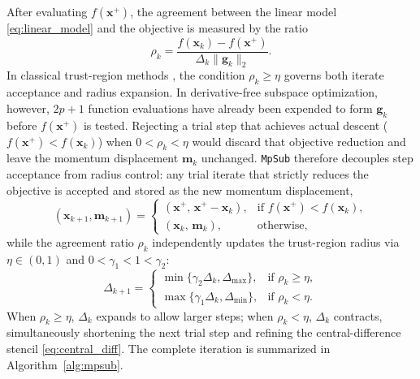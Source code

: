 \documentclass[smallextended]{svjour3}
\newcommand{\bx}{\bm{x}}
\newcommand{\bg}{\bm{g}}
\begin{document}
After evaluating $f(\bx^+)$, the agreement between the linear model \eqref{eq:linear_model} and the objective is measured by the ratio
\begin{equation}
\rho_k = \frac{f(\bx_k) - f(\bx^+)}{\Delta_k \|\bg_k\|_2}.
\label{eq:agreement_ratio}
\end{equation}
In classical trust-region methods \cite{conn2000trust}, the condition $\rho_k \ge \eta$ governs both iterate acceptance and radius expansion. In derivative-free subspace optimization, however, $2p+1$ function evaluations have already been expended to form $\bg_k$ before $f(\bx^+)$ is tested. Rejecting a trial step that achieves actual descent ($f(\bx^+) < f(\bx_k)$) when $0 < \rho_k < \eta$ would discard that objective reduction and leave the momentum displacement $\bm m_k$ unchanged. \texttt{MpSub} therefore decouples step acceptance from radius control: any trial iterate that strictly reduces the objective is accepted and stored as the new momentum displacement,
\begin{equation}
(\bx_{k+1}, \bm m_{k+1}) =
\begin{cases}
(\bx^+,\, \bx^+ - \bx_k), & \text{if } f(\bx^+) < f(\bx_k), \\
(\bx_k,\, \bm m_k), & \text{otherwise},
\end{cases}
\label{eq:accept_rule}
\end{equation}
while the agreement ratio $\rho_k$ independently updates the trust-region radius via $\eta \in (0, 1)$ and $0 < \gamma_1 < 1 < \gamma_2$:
\begin{equation}
\Delta_{k+1} =
\begin{cases}
\min\{\gamma_2 \Delta_k, \Delta_{\max}\}, & \text{if } \rho_k \geq \eta, \\
\max\{\gamma_1 \Delta_k, \Delta_{\min}\}, & \text{if } \rho_k < \eta.
\end{cases}
\label{eq:radius_update_rule}
\end{equation}
When $\rho_k \ge \eta$, $\Delta_k$ expands to allow larger steps; when $\rho_k < \eta$, $\Delta_k$ contracts, simultaneously shortening the next trial step and refining the central-difference stencil \eqref{eq:central_diff}. The complete iteration is summarized in Algorithm~\ref{alg:mpsub}.
\end{document}
